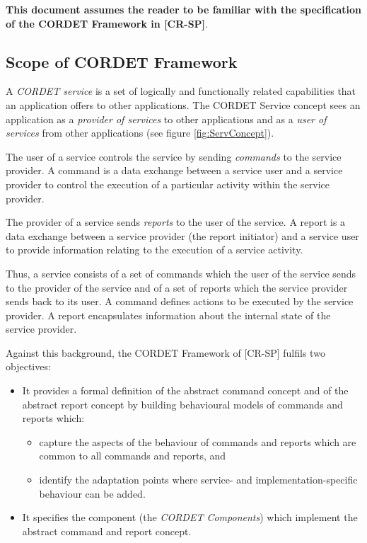 \documentclass{pnp_article}
\begin{document}
\textbf{This document assumes the reader to be familiar with the specification of the CORDET Framework in [CR-SP]}. 

\subsection{Scope of CORDET Framework}\label{sec:ScopeCrFw}
A \textit{CORDET service} is a set of logically and functionally related capabilities that an application offers to other applications. The CORDET Service concept sees an application as a \textit{provider of services} to other applications and as a \textit{user of services} from other applications (see figure \ref{fig:ServConcept}).


The user of a service controls the service by sending \textit{commands} to the service provider. A command is a data exchange between a service user and a service provider to control the execution of a particular activity within the service provider. 

The provider of a service sends \textit{reports} to the user of the service. A report is a data exchange between a service provider (the report initiator) and a service user to provide information relating to the execution of a service activity.

Thus, a service consists of a set of commands which the user of the service sends to the provider of the service and of a set of reports which the service provider sends back to its user. A command defines actions to be executed by the service provider. A report encapsulates information about the internal state of the service provider.

Against this background, the CORDET Framework of [CR-SP] fulfils two objectives:

\begin{itemize}
\item{} It provides a formal definition of the abstract command concept and of the abstract report concept by building behavioural models of commands and reports which:
	\begin{itemize}
	\item capture the aspects of the behaviour of commands and reports which are common to all commands and reports, and
	\item identify the adaptation points where service- and implementation-specific behaviour can be added.
	\end{itemize}
\item{} It specifies the component (the \textit{CORDET Components}) which implement the abstract command and report concept.
\end{itemize}
\end{document}
